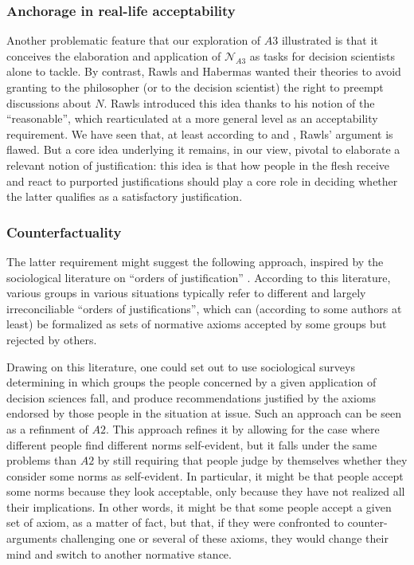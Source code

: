 \documentclass[preprint, french, english, 11pt, authoryear]{elsarticle}%
\begin{document}
\subsubsection{Anchorage in real-life acceptability}
Another problematic feature that our exploration of $A3$ illustrated is that it conceives the elaboration and application of $\mathscr{N}_{A3}$ as tasks for decision scientists alone to tackle. By contrast, Rawls and Habermas wanted their theories to avoid granting to the philosopher (or to the decision scientist) the right to preempt discussions about $N$. Rawls introduced this idea thanks to his notion of the ``reasonable'', which \cite{estlund_democratic_2009} rearticulated at a more general level as an acceptability requirement. We have seen that, at least according to \cite{habermas_reconciliation_1995} and \cite{estlund_democratic_2009}, Rawls' argument is flawed. But a core idea underlying it remains, in our view, pivotal to elaborate a relevant notion of justification: this idea is that how people in the flesh receive and react to purported justifications should play a core role in deciding whether the latter qualifies as a satisfactory justification.

\subsubsection{Counterfactuality}
The latter requirement might suggest the following approach, inspired by the sociological literature on “orders of justification” \citep{boltanski_justification_2006}. According to this literature, various groups in various situations typically refer to different and largely irreconciliable “orders of justifications”, which can (according to some authors at least) be formalized as sets of normative axioms accepted by some groups but rejected by others.

Drawing on this literature, one could set out to use sociological surveys determining in which groups the people concerned by a given application of decision sciences fall, and produce recommendations justified by the axioms endorsed by those people in the situation at issue. Such an approach can be seen as a refinment of $A2$. This approach refines it by allowing for the case where different people find different norms self-evident, but it falls under the same problems than $A2$ by still requiring that people judge by themselves whether they consider some norms as self-evident. In particular, it might be that people accept some norms because they look acceptable, only because they have not realized all their implications.  In other words, it might be that some people accept a given set of axiom, as a matter of fact, but that, if they were confronted to counter-arguments challenging one or several of these axioms, they would change their mind and switch to another normative stance.
\end{document}
